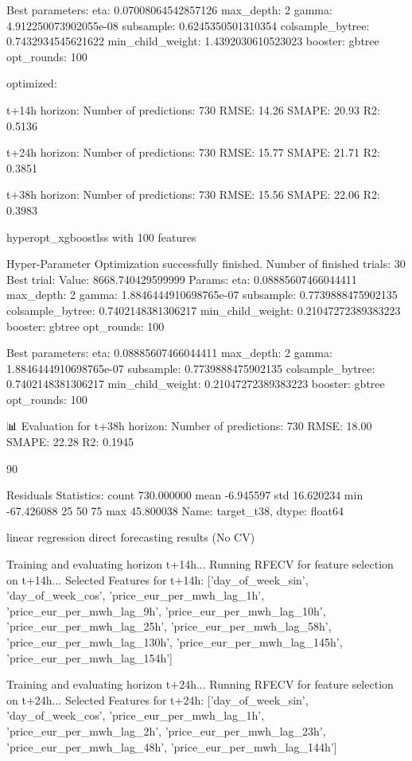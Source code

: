 Best parameters:
eta: 0.07008064542857126
max_depth: 2
gamma: 4.912250073902055e-08
subsample: 0.6245350501310354
colsample_bytree: 0.7432934545621622
min_child_weight: 1.4392030610523023
booster: gbtree
opt_rounds: 100


optimized:

t+14h horizon:
Number of predictions: 730
RMSE: 14.26
SMAPE: 20.93%
R2: 0.5136

t+24h horizon:
Number of predictions: 730
RMSE: 15.77
SMAPE: 21.71%
R2: 0.3851

t+38h horizon:
Number of predictions: 730
RMSE: 15.56
SMAPE: 22.06%
R2: 0.3983

hyperopt_xgboostlss with 100 features

Hyper-Parameter Optimization successfully finished.
  Number of finished trials:  30
  Best trial:
    Value: 8668.740429599999
    Params: 
    eta: 0.08885607466044411
    max_depth: 2
    gamma: 1.8846444910698765e-07
    subsample: 0.7739888475902135
    colsample_bytree: 0.7402148381306217
    min_child_weight: 0.21047272389383223
    booster: gbtree
    opt_rounds: 100

Best parameters:
eta: 0.08885607466044411
max_depth: 2
gamma: 1.8846444910698765e-07
subsample: 0.7739888475902135
colsample_bytree: 0.7402148381306217
min_child_weight: 0.21047272389383223
booster: gbtree
opt_rounds: 100

📊 Evaluation for t+38h horizon:
Number of predictions: 730
RMSE: 18.00
SMAPE: 22.28%
R2: 0.1945

90%

Residuals Statistics:
count    730.000000
mean      -6.945597
std       16.620234
min      -67.426088
25%
50%
75%
max       45.800038
Name: target_t38, dtype: float64



linear regression direct forecasting results (No CV)

Training and evaluating horizon t+14h...
Running RFECV for feature selection on t+14h...
Selected Features for t+14h: ['day_of_week_sin', 'day_of_week_cos', 'price_eur_per_mwh_lag_1h', 'price_eur_per_mwh_lag_9h', 'price_eur_per_mwh_lag_10h', 'price_eur_per_mwh_lag_25h', 'price_eur_per_mwh_lag_58h', 'price_eur_per_mwh_lag_130h', 'price_eur_per_mwh_lag_145h', 'price_eur_per_mwh_lag_154h']

Training and evaluating horizon t+24h...
Running RFECV for feature selection on t+24h...
Selected Features for t+24h: ['day_of_week_sin', 'day_of_week_cos', 'price_eur_per_mwh_lag_1h', 'price_eur_per_mwh_lag_2h', 'price_eur_per_mwh_lag_23h', 'price_eur_per_mwh_lag_48h', 'price_eur_per_mwh_lag_144h']

